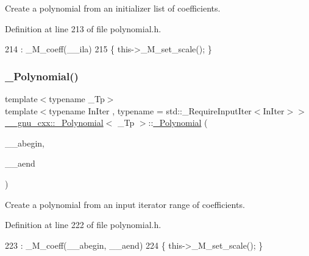 Create a polynomial from an initializer list of coefficients. 

Definition at line 213 of file polynomial.\+h.


\begin{DoxyCode}
214       : \_M\_coeff(\_\_ila)
215       \{ this->\_M\_set\_scale(); \}
\end{DoxyCode}
\mbox{\label{class____gnu__cxx_1_1__Polynomial_a45589d1d036861179488c44f3029f335}} 
\subsubsection{\texorpdfstring{\+\_\+\+Polynomial()}{\_Polynomial()}\hspace{0.1cm}{\footnotesize\ttfamily [7/9]}}
{\footnotesize\ttfamily template$<$typename \+\_\+\+Tp$>$ \\
template$<$typename In\+Iter , typename  = std\+::\+\_\+\+Require\+Input\+Iter$<$\+In\+Iter$>$$>$ \\
\hyperlink{class____gnu__cxx_1_1__Polynomial}{\+\_\+\+\_\+gnu\+\_\+cxx\+::\+\_\+\+Polynomial}$<$ \+\_\+\+Tp $>$\+::\hyperlink{class____gnu__cxx_1_1__Polynomial}{\+\_\+\+Polynomial} (\begin{DoxyParamCaption}\item[{const In\+Iter \&}]{\+\_\+\+\_\+abegin,  }\item[{const In\+Iter \&}]{\+\_\+\+\_\+aend }\end{DoxyParamCaption})\hspace{0.3cm}{\ttfamily [inline]}}

Create a polynomial from an input iterator range of coefficients. 

Definition at line 222 of file polynomial.\+h.


\begin{DoxyCode}
223         : \_M\_coeff(\_\_abegin, \_\_aend)
224         \{ this->\_M\_set\_scale(); \}
\end{DoxyCode}
\mbox{\label{class____gnu__cxx_1_1__Polynomial_a86249f53e97e72eff11242a8ba85ba4c}} 
